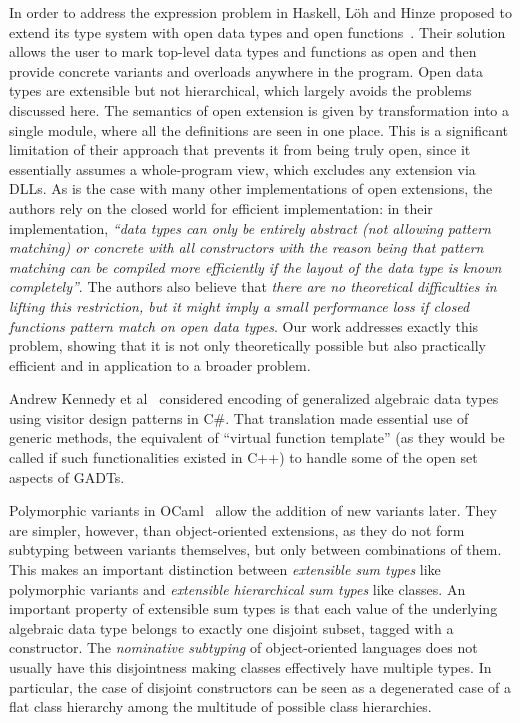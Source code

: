 In order to address the expression problem in Haskell, L\"{o}h and Hinze proposed to 
extend its type system with open data types and open functions~\cite{LohHinze2006}.
Their solution allows the user to mark top-level data types and functions as 
open and then provide concrete variants and overloads anywhere in the program. 
Open data types are extensible but not hierarchical, which largely avoids the 
problems discussed here. The semantics of open extension is given by 
transformation into a single module, where all the definitions are seen in one 
place. This is a significant limitation of their approach that prevents it from 
being truly open, since it essentially assumes a whole-program view, which 
excludes any extension via DLLs. As is the case with many other implementations 
of open extensions, the authors rely on the closed world for efficient 
implementation: in their implementation, \emph{``data types can only be entirely 
abstract (not allowing pattern matching) or concrete with all constructors with 
the reason being that pattern matching can be compiled more efficiently if the 
layout of the data type is known completely''}. The authors also believe that 
\emph{there are no theoretical difficulties in lifting this restriction, but it 
might imply a small performance loss if closed functions pattern match on open 
data types}. Our work addresses exactly this problem, showing that it is not 
only theoretically possible but also practically efficient and in application to 
a broader problem.

Andrew Kennedy et al~\cite{GADTOOP05} considered encoding of generalized 
algebraic data types~\cite{SPJ06} using visitor design patterns in C\#.  That 
translation made essential use of generic methods, the equivalent of ``virtual 
function template'' (as they would be called if such functionalities existed in 
C++) to handle some of the open set aspects of GADTs.

Polymorphic variants in OCaml~\cite{garrigue-98} allow the addition of new variants 
later. They are simpler, however, than object-oriented extensions, as they do not 
form subtyping between variants themselves, but only between combinations of them. 
This makes an important distinction between \emph{extensible sum types} like 
polymorphic variants and \emph{extensible hierarchical sum types} like classes.
An important property of extensible sum types is that each value of the 
underlying algebraic data type belongs to exactly one disjoint subset, tagged with 
a constructor. The \emph{nominative subtyping} of object-oriented languages does 
not usually have this disjointness making classes effectively have multiple 
types. In particular, the case of disjoint constructors can be seen as a 
degenerated case of a flat class hierarchy among the multitude of possible class 
hierarchies.

